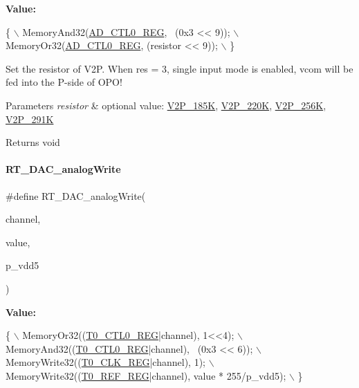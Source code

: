 {\bfseries Value\+:}
\begin{DoxyCode}
\{                                          \(\backslash\)
        MemoryAnd32(\mbox{\hyperlink{a00020_a7c90725a1b307a000a44211bcb115a47}{AD\_CTL0\_REG}}, ~(0x3 << 9)); \(\backslash\)
        MemoryOr32(\mbox{\hyperlink{a00020_a7c90725a1b307a000a44211bcb115a47}{AD\_CTL0\_REG}}, (resistor << 9));   \(\backslash\)
    \}
\end{DoxyCode}


Set the resistor of V2P. When res = 3, single input mode is enabled, vcom will be fed into the P-\/side of O\+P\+O! 


\begin{DoxyParams}{Parameters}
{\em resistor} & optional value\+: \mbox{\hyperlink{a00002_a80255c41c3764feff9b79664f15feb46aa035ba8725fe8565c5505a295c22ea8e}{V2\+P\+\_\+185K}}, \mbox{\hyperlink{a00002_a80255c41c3764feff9b79664f15feb46a1ac9774056594cac22ae2c6431fa4277}{V2\+P\+\_\+220K}}, \mbox{\hyperlink{a00002_a80255c41c3764feff9b79664f15feb46a4b7eb698a06cc149cbb1b7f8f4dd4a8e}{V2\+P\+\_\+256K}}, \mbox{\hyperlink{a00002_a80255c41c3764feff9b79664f15feb46ae20e5b8adb1fa31fa8df9a56d05e7eb5}{V2\+P\+\_\+291K}} \\
\hline
\end{DoxyParams}
\begin{DoxyReturn}{Returns}
void 
\end{DoxyReturn}
\mbox{\label{a00002_ab44c37130776b81ef554d8967fcf9e62}} 
\paragraph{\texorpdfstring{R\+T\+\_\+\+D\+A\+C\+\_\+analog\+Write}{RT\_DAC\_analogWrite}}
{\footnotesize\ttfamily \#define R\+T\+\_\+\+D\+A\+C\+\_\+analog\+Write(\begin{DoxyParamCaption}\item[{}]{channel,  }\item[{}]{value,  }\item[{}]{p\+\_\+vdd5 }\end{DoxyParamCaption})}

{\bfseries Value\+:}
\begin{DoxyCode}
\{                                                               \(\backslash\)
    MemoryOr32((\mbox{\hyperlink{a00020_ac94b0659ef32086a6752672082c0b3ed}{T0\_CTL0\_REG}}|channel), 1<<4);                    \(\backslash\)
    MemoryAnd32((\mbox{\hyperlink{a00020_ac94b0659ef32086a6752672082c0b3ed}{T0\_CTL0\_REG}}|channel), ~(0x3 << 6));            \(\backslash\)
    MemoryWrite32((\mbox{\hyperlink{a00020_a02a329d71e5fe86e9a0a8513ea5e1630}{T0\_CLK\_REG}}|channel), 1);                     \(\backslash\)
    MemoryWrite32((\mbox{\hyperlink{a00020_a857679d0d1c771053cac56dc76c38caa}{T0\_REF\_REG}}|channel), value * 255/p\_vdd5);    \(\backslash\)
\}
\end{DoxyCode}


